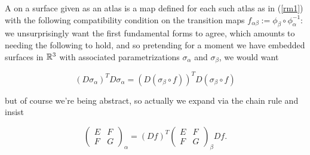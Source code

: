 \documentclass[11pt]{scrartcl}
\begin{document}
\begin{definition}

A  on a surface given as an atlas is a map defined for each such atlas as in (\ref{rm1}) with the following compatibility condition on the transition maps $f_{\alpha \beta} := \phi_\beta \circ \phi_\alpha^{-1}$: we unsurprisingly want the first fundamental forms to agree, which amounts to needing the following to hold, and so pretending for a moment we have embedded surfaces in $\mathbb R^3$ with associated parametrizations $\sigma_\alpha$ and $\sigma_\beta$, we would want

\begin{equation}
    (D\sigma_\alpha)^T D\sigma_\alpha = (D (\sigma_\beta \circ f))^T D(\sigma_\beta \circ f)
\end{equation}

but of course we're being abstract, so actually we expand via the chain rule and insist

\begin{equation}
    \begin{pmatrix} E & F \\ F & G \end{pmatrix}_\alpha = (Df)^T \begin{pmatrix} E & F \\ F & G \end{pmatrix}_\beta Df.
\end{equation}
\end{definition}
\end{document}
